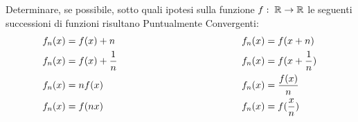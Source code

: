\begin{exercise}
	Determinare, se possibile, sotto quali ipotesi sulla funzione $f:\; \mathbb{R} \to \mathbb{R}$ le seguenti successioni di funzioni risultano Puntualmente Convergenti:
	\begin{alignat*}{2}
		f_n(x) &= f(x) + n \hspace*{.35\linewidth} & f_n(x) &= f(x + n)\\
		f_n(x) &= f(x) + \frac{1}{n} & f_n(x) &= f(x + \frac{1}{n})\\
		f_n(x) &= nf(x) & f_n(x) &= \frac{f(x)}{n}\\
		f_n(x) &= f(nx) & f_n(x) &= f(\frac{x}{n})
	\end{alignat*}
\end{exercise}

\cbstart
\begingroup
\renewcommand\theequation{\arabic{section}.\arabic{equation}}
\setcounter{equation}{0} %
